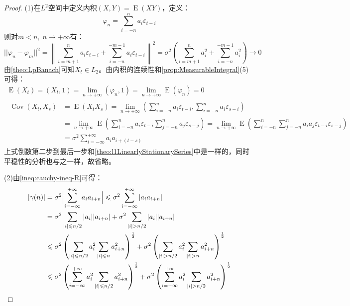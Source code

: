 \begin{proof}
	(1)在$L^2$空间中定义内积$(X,Y)=\operatorname{E}(XY)$，定义：
	\begin{equation*}
		\varphi_n=\sum_{i=-n}^{n}a_i\varepsilon_{t-i}
	\end{equation*}
	则对$m<n,\;n\to+\infty$有：
	\begin{equation*}
		||\varphi_n-\varphi_m||^2=\left\|\sum_{i=m+1}^{n}a_i\varepsilon_{t-i}+\sum_{i=-n}^{-m-1}a_i\varepsilon_{t-i}\right\|^2=\sigma^2\left(\sum_{i=m+1}^{n}a_i^2+\sum_{i=-n}^{-m-1}a_i^2\right)\to0
	\end{equation*}
	由\cref{theo:LpBanach}可知$X_t\in L_2$。由内积的连续性和\cref{prop:MeasurableIntegral}(5)可得：
	\begin{gather*}
		\operatorname{E}(X_t)=(X_t,1)=\lim_{n\to+\infty}(\varphi_n,1)=\lim_{n\to+\infty}\operatorname{E}(\varphi_n)=0 \\
		\begin{aligned}
			\operatorname{Cov}(X_t,X_s)&=\operatorname{E}(X_tX_s)=\lim_{n\to+\infty}\left(\sum_{i=-n}^{n}a_i\varepsilon_{t-i},\sum_{i=-n}^{n}a_i\varepsilon_{s-i}\right) \\
			&=\lim_{n\to+\infty}\operatorname{E}\left(\sum_{i=-n}^{n}a_i\varepsilon_{t-i}\sum_{j=-n}^{n}a_j\varepsilon_{s-j}\right)=\lim_{n\to+\infty}\operatorname{E}\left(\sum_{i=-n}^{n}\sum_{j=-n}^{n}a_ia_j\varepsilon_{t-i}\varepsilon_{s-j}\right) \\
			&=\sigma^2\sum_{i=-\infty}^{+\infty}a_ia_{i+(t-s)}
		\end{aligned}
	\end{gather*}
	上式倒数第二步到最后一步和\cref{theo:l1LinearlyStationarySeries}中是一样的，同时平稳性的分析也与之一样，故省略。\par
	(2)由\cref{ineq:cauchy-ineq-R}可得：
	\begin{align*}
		|\gamma(n)|
		&=\sigma^2\Bigl|\sum_{i=-\infty}^{+\infty}a_ia_{i+n}\Bigr| \leqslant\sigma^2\sum_{i=-\infty}^{+\infty}|a_ia_{i+n}| \\
		&=\sigma^2\sum_{|i|\leqslant n/2}|a_i||a_{i+n}|+\sigma^2\sum_{|i|> n/2}|a_i||a_{i+n}| \\
		&\leqslant\sigma^2\left(\sum_{|i|\leqslant n/2}a_i^2\sum_{|i|\leqslant n}a_{i+n}^2\right)^\frac{1}{2}+\sigma^2\left(\sum_{|i|>n/2}a_i^2\sum_{|i|>n}a_{i+n}^2\right)^\frac{1}{2} \\
		&\leqslant\sigma^2\left(\sum_{i=-\infty}^{+\infty}a_i^2\sum_{|i|\leqslant n/2}a_{i+n}^2\right)^\frac{1}{2}+\sigma^2\left(\sum_{i=-\infty}^{+\infty}a_i^2\sum_{|i|>n/2}a_{i+n}^2\right)^\frac{1}{2}

\end{align*}
\end{proof}
